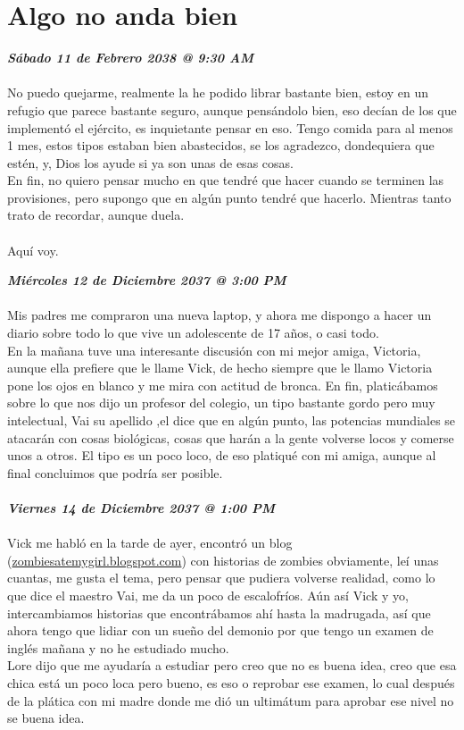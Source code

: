 \chapter{Algo no anda bien}
\textbf{\textit{Sábado 11 de Febrero 2038 @ 9:30 AM}}\\\\[1.5cm]
No puedo quejarme, realmente la he podido librar bastante bien, estoy en un refugio que parece bastante 
seguro, aunque pensándolo bien, eso decían de los que implementó el ejército, es inquietante pensar en eso.
Tengo comida para al menos 1 mes, estos tipos estaban bien abastecidos, se los agradezco, dondequiera que 
estén, y, Dios los ayude si ya son unas de esas cosas.\\
En fin, no quiero pensar mucho en que tendré que hacer cuando se terminen las provisiones, pero supongo que 
en algún punto tendré que hacerlo.
Mientras tanto trato de recordar, aunque duela.\\\\
Aquí voy.
\newpage

\textbf{\textit{Miércoles 12 de Diciembre 2037 @ 3:00 PM\\\\[1.5cm]}}
Mis padres me compraron una nueva laptop, y ahora me dispongo a hacer un diario sobre todo lo que vive un 
adolescente de 17 años, o casi todo.\\
En la mañana tuve una interesante discusión con mi mejor amiga, Victoria, aunque ella prefiere que le llame
Vick, de hecho siempre que le llamo Victoria pone los ojos en blanco y me mira con actitud de bronca. En fin, platicábamos sobre lo que nos dijo un profesor del colegio, un tipo bastante gordo pero muy intelectual, 
Vai su apellido ,el dice que en algún punto, las potencias mundiales se atacarán con cosas biológicas, cosas que harán a la gente volverse locos y comerse unos a otros. El tipo es un poco loco, de eso platiqué con mi amiga, aunque al final concluimos que podría ser posible.\\\\

\textit{\textbf{Viernes 14 de Diciembre 2037 @ 1:00 PM\\\\[1.5cm]}}
Vick me habló en la tarde de ayer, encontró un blog (\url{zombiesatemygirl.blogspot.com}) con historias de zombies 
obviamente, leí unas cuantas, me gusta el tema, pero pensar que pudiera volverse realidad, como lo que dice el maestro Vai, me da un poco de escalofríos. Aún así Vick y yo, intercambiamos historias que encontrábamos ahí hasta la madrugada, así que ahora tengo que lidiar con un sueño del demonio por que tengo un examen de 
inglés mañana y no he estudiado mucho.\\
Lore dijo que me ayudaría a estudiar pero creo que no es buena idea, creo que esa chica está un poco loca pero bueno, es eso o reprobar ese examen, lo cual después de la plática con mi madre donde me dió un ultimátum para aprobar ese nivel no se buena idea.\\\\

